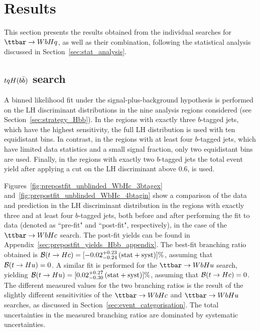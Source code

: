 \section{Results}
\label{sec:result}

This section presents the results obtained from the individual searches for $\Hq$, as well as their combination,
following the statistical analysis discussed in Section~\ref{sec:stat_analysis}.

\subsection{$tqH(b\bar{b})$ search}
\label{sec:results_Hbb}

A binned likelihood fit under the signal-plus-background hypothesis 
is performed on the LH discriminant distributions in the nine analysis regions considered (see Section~\ref{sec:strategy_Hbb}).
In the regions with exactly three $b$-tagged jets, which have the highest sensitivity, the full LH distribution is used with ten equidistant bins. 
In contrast, in the regions with at least four $b$-tagged jets,
which have limited data statistics and a small signal fraction, only two equidistant bins are used. Finally, in the regions with exactly two $b$-tagged jets 
the total event yield after applying a cut on the LH discriminant above 0.6, is used. 

Figures~\ref{fig:prepostfit_unblinded_WbHc_3btagex} and~\ref{fig:prepostfit_unblinded_WbHc_4btagin} show a comparison 
of the data and prediction in the LH discriminant distribution in the regions with exactly three and at least four $b$-tagged jets, 
both before and after performing the fit to data (denoted as ``pre-fit" and ``post-fit", respectively), in the case of the $\Hc$ search.  
The post-fit yields can be found in Appendix~\ref{sec:prepostfit_yields_Hbb_appendix}.
The best-fit branching ratio obtained is $\mathcal{B}(t\to Hc)=[-0.02^{+0.23}_{-0.24}\,(\mathrm{stat+syst})]\%$,
assuming that $\mathcal{B}(t\to Hu)=0$. 
A similar fit is performed for the $\Hu$ search, yielding $\mathcal{B}(t\to Hu)=[0.02^{+0.27}_{-0.30}\,(\mathrm{stat+syst})]\%$,
assuming that $\mathcal{B}(t\to Hc)=0$.  The different measured values for the two branching ratios is the result of the slightly different sensitivities
of the $\Hc$ and $\Hu$ searches, as discussed in Section~\ref{sec:event_categorisation}.
The total uncertainties in the measured branching ratios are dominated by systematic uncertainties.

